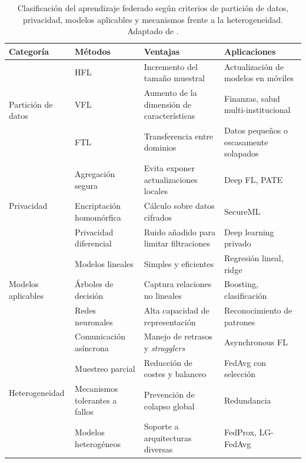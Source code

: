 \documentclass{report}
\begin{document}
\begin{table}[H]
\centering
\caption{Clasificación del aprendizaje federado según criterios de partición de datos, privacidad, modelos aplicables y mecanismos frente a la heterogeneidad. Adaptado de \cite{zhang2021survey}.}
\label{tab:fl-categorias}
\begin{tabular}{p{2.5cm} p{3cm} p{4cm} p{4cm}}
\toprule
\textbf{Categoría} & \textbf{Métodos} & \textbf{Ventajas} & \textbf{Aplicaciones} \\
\midrule
\multirow{3}{*}{Partición de datos} 
 & HFL & Incremento del tamaño muestral & Actualización de modelos en móviles \cite{hard2018federated} \\
 & VFL & Aumento de la dimensión de características & Finanzas, salud multi-institucional \cite{cheng2021secureboost} \\
 & FTL & Transferencia entre dominios & Datos pequeños o escasamente solapados \cite{yang2019federated} \\
\midrule
\multirow{3}{*}{Privacidad} 
 & Agregación segura & Evita exponer actualizaciones locales & Deep FL, PATE \cite{bonawitz2017practical,papernot2017semi} \\
 & Encriptación homomórfica & Cálculo sobre datos cifrados & SecureML \cite{mohassel2017secureml} \\
 & Privacidad diferencial & Ruido añadido para limitar filtraciones & Deep learning privado \cite{abadi2016deep} \\
\midrule
\multirow{3}{*}{Modelos aplicables} 
 & Modelos lineales & Simples y eficientes & Regresión lineal, ridge \\
 & Árboles de decisión & Captura relaciones no lineales & Boosting, clasificación \cite{cheng2021secureboost} \\
 & Redes neuronales & Alta capacidad de representación & Reconocimiento de patrones \cite{mcmahan2017communication} \\
\midrule
\multirow{4}{*}{Heterogeneidad} 
 & Comunicación asíncrona & Manejo de retrasos y \textit{stragglers} & Asynchronous FL \cite{xie2019asynchronous} \\
 & Muestreo parcial & Reducción de costes y balanceo & FedAvg con selección \cite{mcmahan2017communication} \\
 & Mecanismos tolerantes a fallos & Prevención de colapso global & Redundancia \\
 & Modelos heterogéneos & Soporte a arquitecturas diversas & FedProx, LG-FedAvg \cite{li2020federated} \\
\bottomrule
\end{tabular}
\end{table}
\end{document}
